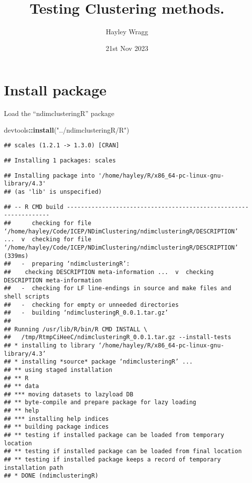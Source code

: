 \documentclass[
]{article}
\title{Testing Clustering methods.}
\author{Hayley Wragg}
\date{21st Nov 2023}
\newenvironment{Shaded}{\begin{snugshade}}{\end{snugshade}}
\newcommand{\FunctionTok}[1]{\textcolor[rgb]{0.13,0.29,0.53}{\textbf{#1}}}
\newcommand{\NormalTok}[1]{#1}
\newcommand{\SpecialCharTok}[1]{\textcolor[rgb]{0.81,0.36,0.00}{\textbf{#1}}}
\newcommand{\StringTok}[1]{\textcolor[rgb]{0.31,0.60,0.02}{#1}}
\begin{document}
\maketitle

\hypertarget{install-package}{%
\section{Install package}\label{install-package}}

Load the ``ndimclusteringR'' package

\begin{Shaded}
\begin{Highlighting}[]
\NormalTok{devtools}\SpecialCharTok{::}\FunctionTok{install}\NormalTok{(}\StringTok{"../ndimclusteringR/R"}\NormalTok{)}
\end{Highlighting}
\end{Shaded}

\begin{verbatim}
## scales (1.2.1 -> 1.3.0) [CRAN]
\end{verbatim}

\begin{verbatim}
## Installing 1 packages: scales
\end{verbatim}

\begin{verbatim}
## Installing package into '/home/hayley/R/x86_64-pc-linux-gnu-library/4.3'
## (as 'lib' is unspecified)
\end{verbatim}

\begin{verbatim}
## -- R CMD build -----------------------------------------------------------------
##      checking for file ‘/home/hayley/Code/ICEP/NDimClustering/ndimclusteringR/DESCRIPTION’ ...  v  checking for file ‘/home/hayley/Code/ICEP/NDimClustering/ndimclusteringR/DESCRIPTION’ (339ms)
##   -  preparing ‘ndimclusteringR’:
##    checking DESCRIPTION meta-information ...  v  checking DESCRIPTION meta-information
##   -  checking for LF line-endings in source and make files and shell scripts
##   -  checking for empty or unneeded directories
##   -  building ‘ndimclusteringR_0.0.1.tar.gz’
##      
## Running /usr/lib/R/bin/R CMD INSTALL \
##   /tmp/RtmpCiHeeC/ndimclusteringR_0.0.1.tar.gz --install-tests 
## * installing to library ‘/home/hayley/R/x86_64-pc-linux-gnu-library/4.3’
## * installing *source* package ‘ndimclusteringR’ ...
## ** using staged installation
## ** R
## ** data
## *** moving datasets to lazyload DB
## ** byte-compile and prepare package for lazy loading
## ** help
## *** installing help indices
## ** building package indices
## ** testing if installed package can be loaded from temporary location
## ** testing if installed package can be loaded from final location
## ** testing if installed package keeps a record of temporary installation path
## * DONE (ndimclusteringR)
\end{verbatim}
\end{document}
